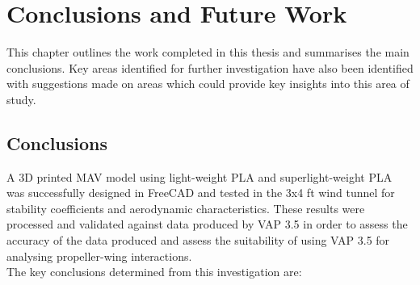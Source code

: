 \graphicspath{{./Figs/}}

\chapter{Conclusions and Future Work} 
This chapter outlines the work completed in this thesis and summarises the main conclusions. Key areas identified for further investigation have also been identified with suggestions made on areas which could provide key insights into this area of study. 
\section{Conclusions}

A 3D printed MAV model using light-weight PLA and superlight-weight PLA was successfully designed in FreeCAD and tested in the 3x4 ft wind tunnel for stability coefficients and aerodynamic characteristics. These results were processed and validated against data produced by VAP 3.5 in order to assess the accuracy of the data produced and assess the suitability of using VAP 3.5 for analysing propeller-wing interactions.\\

The key conclusions determined from this investigation are:

